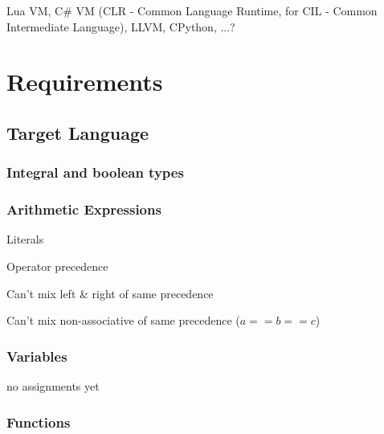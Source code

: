         Lua VM, C\# VM (CLR - Common Language Runtime, for CIL - Common Intermediate Language), LLVM, CPython, ...?

\chapter{Requirements}

	

    \section{Target Language}
    
        \subsection{Integral and boolean types}
    
        \subsection{Arithmetic Expressions}
        
            Literals
            
            Operator precedence
            
            Can't mix left \& right of same precedence
            
            Can't mix non-associative of same precedence ($a==b==c$)
        
        \subsection{Variables}
            
            no assignments yet
        
        \subsection{Functions}
        
